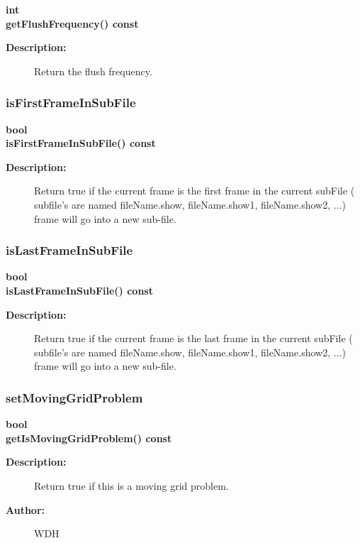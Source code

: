 \begin{flushleft} \textbf{%
int   \\ 
\settowidth{\OgshowIncludeArgIndent}{getFlushFrequency(}%
getFlushFrequency() const
}\end{flushleft}
\begin{description}
\item[{\bf Description:}] 
     Return the flush frequency.
\end{description}
\subsubsection{isFirstFrameInSubFile}
 
\begin{flushleft} \textbf{%
bool  \\ 
\settowidth{\OgshowIncludeArgIndent}{isFirstFrameInSubFile(}%
isFirstFrameInSubFile() const
}\end{flushleft}
\begin{description}
\item[{\bf Description:}] 
     Return true if the current frame is the first frame in the current subFile ( subfile's are
 named fileName.show, fileName.show1, fileName.show2, ...)
   frame will go into a new sub-file. 
\end{description}
\subsubsection{isLastFrameInSubFile}
 
\begin{flushleft} \textbf{%
bool  \\ 
\settowidth{\OgshowIncludeArgIndent}{isLastFrameInSubFile(}%
isLastFrameInSubFile() const
}\end{flushleft}
\begin{description}
\item[{\bf Description:}] 
     Return true if the current frame is the last frame in the current subFile ( subfile's are
 named fileName.show, fileName.show1, fileName.show2, ...)
   frame will go into a new sub-file. 
\end{description}
\subsubsection{setMovingGridProblem}
 
\begin{flushleft} \textbf{%
bool  \\ 
\settowidth{\OgshowIncludeArgIndent}{getIsMovingGridProblem(}%
getIsMovingGridProblem() const
}\end{flushleft}
\begin{description}
\item[{\bf Description:}] 
     Return true if this is a moving grid problem.
\item[{\bf Author:}]  WDH
\end{description}
